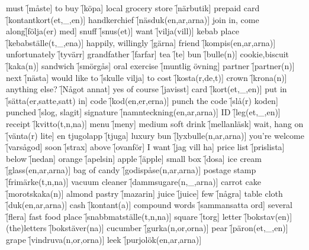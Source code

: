 \begin{questions}
    \begin{multicols}{2}
        \raggedcolumns
        \question must \f[måste]
        \question to buy \f[köpa]
        \question local grocery store \f[närbutik]
        \question prepaid card \f[kontantkort(et,\_,en)]
        \question handkerchief \f[näsduk(en,ar,arna)]
        \question join in, come along\f[följa(er) med]
        \question snuff \f[snus(et)]
        \question want \f[vilja(vill)]
        \question kebab place \f[kebabställe(t,\_,ena)]
        \question happily, willingly \f[gärna]
        \question friend \f[kompis(en,ar,arna)]
        \question unfortunately \f[tyvärr]
        \question grandfather \f[farfar]
        \question tea \f[te]
        \question bun \f[bulle(n)]
        \question cookie,biscuit \f[kaka(n)]
        \question sandwich \f[smörgås]
        \question oral exercise \f[muntlig övning]
        \question partner \f[partner(n)]
        \question next \f[nästa]
        \question would like to \f[skulle vilja]
        \question to cost \f[kosta(r,de,t)]
        \question crown \f[krona(n)]
        \question anything else? \f[Något annat]
        \question yes of course \f[javisst]
        \question card \f[kort(et,\_,en)]
        \question put in \f[sätta(er,satte,satt) in]
        \question code \f[kod(en,er,erna)]
        \question punch the code \f[slå(r) koden]
        \question punched \f[slog, slagit]
        \question signature \f[namnteckning(en,ar,arna)]
        \question ID \f[leg(et,\_,en)]
        \question receipt \f[kvitto(t,n,na)]
        \question menu \f[meny]
        \question medium soft drink \f[mellanläsk]
        \question wait, hang on \f[vänta(r) lite]
        \question en tjugolapp \f[tjuga]
        \question luxury bun \f[lyxbulle(n,ar,arna)]
        \question you're welcome \f[varsågod]
        \question soon \f[strax]
        \question above \f[ovanför]
        \question I want \f[jag vill ha]
        \question price list \f[prislista]
        \question below \f[nedan]
        \question orange \f[apelsin]
        \question apple \f[äpple]
        \question small box \f[dosa]
        \question ice cream \f[glass(en,ar,arna)]
        \question bag of candy \f[godispåse(n,ar,arna)]
        \question postage stamp \f[frimärke(t,n,na)]
        \question vacuum cleaner \f[dammsugare(n,\_,arna)]
        \question carrot cake \f[morotskaka(n)]
        \question almond pastry \f[mazarin]
        \question juice \f[juice]
        \question few \f[några]
        \question table cloth \f[duk(en,ar,arna)]
        \question cash \f[kontant(a)]
        \question compound words \f[sammansatta ord]
        \question several \f[flera]
        \question fast food place \f[snabbmatställe(t,n,na)]
        \question square \f[torg]
        \question letter \f[bokstav(en)]
        \question (the)letters \f[bokstäver(na)]
        \question cucumber \f[gurka(n,or,orna)]
        \question pear \f[päron(et,\_,en)]
        \question grape \f[vindruva(n,or,orna)]
        \question leek \f[purjolök(en,ar,arna)]
    \end{multicols}
\end{questions}
